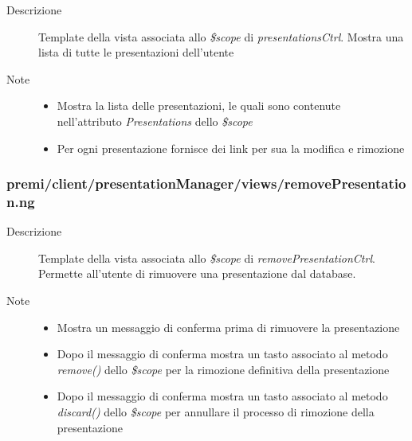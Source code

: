 \begin{description}
\item[Descrizione] \hfill
	Template della vista associata allo \textit{\$scope} di \textit{presentationsCtrl}. Mostra una lista di tutte le presentazioni dell'utente
\item[Note] \hfill
	\begin{itemize}
			\item Mostra la lista delle presentazioni, le quali sono contenute nell'attributo \textit{Presentations} dello \textit{\$scope}
			\item Per ogni presentazione fornisce dei link per sua la modifica e rimozione
	\end{itemize}
\end{description}



\subsubsection{premi/client/presentationManager/views/removePresentation.ng}

\begin{description}
\item[Descrizione] \hfill
	Template della vista associata allo \textit{\$scope} di \textit{removePresentationCtrl}. Permette all'utente di rimuovere una presentazione dal database.
\item[Note] \hfill
	\begin{itemize}
			\item Mostra un messaggio di conferma prima di rimuovere la presentazione
			\item Dopo il messaggio di conferma mostra un tasto associato al metodo \textit{remove()} dello \textit{\$scope} per la rimozione definitiva della presentazione
			\item Dopo il messaggio di conferma mostra un tasto associato al metodo \textit{discard()} dello \textit{\$scope} per annullare il processo di rimozione della presentazione
	\end{itemize}
\end{description}





























